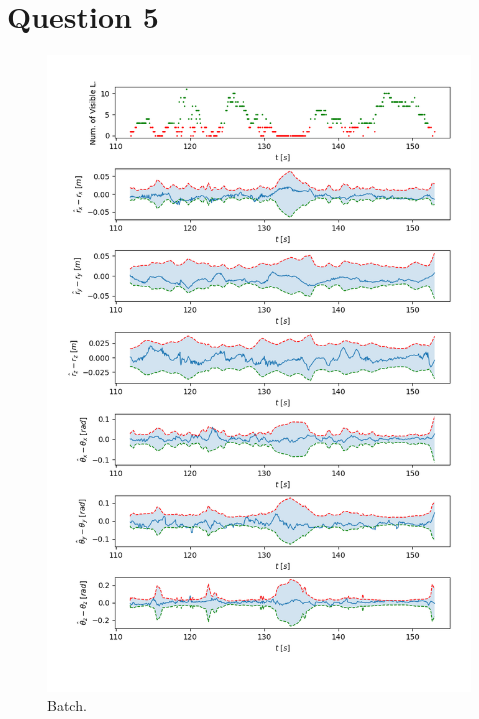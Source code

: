 \documentclass[a4paper]{article}
\begin{document}
\section*{Question 5}

\begin{figure}[H]
    \centering
    \includegraphics[width=\textwidth]{code/batch.png}
    \caption{Batch.}
    \label{fig:5a}
\end{figure}
\end{document}
